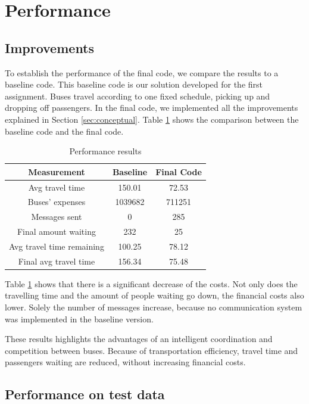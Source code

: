 \section{Performance}
\subsection{Improvements}

To establish the performance of the final code, we compare the results to a baseline code. This baseline code is our solution developed for the first assignment. Buses travel according to one fixed schedule, picking up and dropping off passengers. In the final code, we implemented all the improvements explained in Section \ref{sec:conceptual}. Table \ref{table:table1} shows the comparison between the baseline code and the final code.

\begin{table}[htbp]
\centering
\begin{tabular}{ |c|c|c|  }
 \hline
  Measurement & Baseline & Final Code \\
 \hline
  Avg travel time & 150.01 & 72.53 \\
  Buses' expenses & 1039682 & 711251 \\
  Messages sent & 0 & 285  \\
  Final amount waiting & 232 & 25 \\
  Avg travel time remaining & 100.25 & 78.12 \\
  Final avg travel time & 156.34 & 75.48 \\
 \hline
\end{tabular}
\label{table:table1}
\caption{Performance results}
\end{table}

Table \ref{table:table1} shows that there is a significant decrease of the costs. Not only does the travelling time and the amount of people waiting go down, the financial costs also lower. Solely the number of messages increase, because no communication system was implemented in the baseline version. 

These results highlights the advantages of an intelligent coordination and competition between buses. Because of transportation efficiency, travel time and passengers waiting are reduced, without increasing financial costs.

\subsection{Performance on test data}

